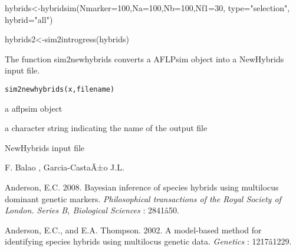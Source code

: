 \documentclass[letterpaper]{book}
\begin{document}
%
\begin{Examples}
\begin{ExampleCode}
hybrids<-hybridsim(Nmarker=100,Na=100,Nb=100,Nf1=30, type="selection", hybrid="all")

hybrids2<-sim2introgress(hybrids)
\end{ExampleCode}
\end{Examples}
%
\begin{Description}\relax
The function sim2newhybrids converts a AFLPsim object into a NewHybrids input file. 

\end{Description}
%
\begin{Usage}
\begin{verbatim}
sim2newhybrids(x,filename)

\end{verbatim}
\end{Usage}
%
\begin{Arguments}
\begin{ldescription}

\item[\code{x}] 
a aflpsim object

\item[\code{filename}] 
a character string indicating the name of the output file
\end{ldescription}
\end{Arguments}
%
\begin{Value}
NewHybrids input file
\end{Value}
%
\begin{Author}\relax
F. Balao , Garcia-CastaÃ±o J.L.
\end{Author}
%
\begin{References}\relax
Anderson, E.C. 2008. Bayesian inference of species hybrids using multilocus dominant genetic markers. \emph{Philosophical transactions of the Royal Society of London. Series B, Biological Sciences} : 2841â50. 

Anderson, E.C., and E.A. Thompson. 2002. A model-based method for identifying species hybrids using multilocus genetic data. \emph{Genetics} : 1217â1229.
\end{References}
%
\begin{SeeAlso}\relax
{}
\end{SeeAlso}
\end{document}
